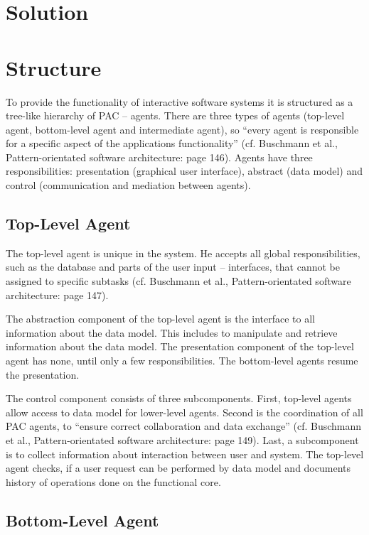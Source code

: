 \documentclass{scrbook}
\begin{document}
\section{Solution}

\section{Structure}	%

To provide the functionality of interactive software systems it is structured as a tree-like hierarchy of
PAC – agents. There are three types of agents (top-level agent, bottom-level agent and intermediate
agent), so “every agent is responsible for a specific aspect of the applications functionality” (cf.
Buschmann et al., Pattern-orientated software architecture: page 146). Agents have three
responsibilities: presentation (graphical user interface), abstract (data model) and control
(communication and mediation between agents).

\subsection{Top-Level Agent}	%

The top-level agent is unique in the system. He accepts all global responsibilities, such as the
database and parts of the user input – interfaces, that cannot be assigned to specific subtasks (cf.
Buschmann et al., Pattern-orientated software architecture: page 147).

The abstraction component of the top-level agent is the interface to all information about the data
model. This includes to manipulate and retrieve information about the data model.
The presentation component of the top-level agent has none, until only a few responsibilities. The
bottom-level agents resume the presentation.

The control component consists of three subcomponents. First, top-level agents allow access to data
model for lower-level agents. Second is the coordination of all PAC agents, to “ensure correct
collaboration and data exchange” (cf. Buschmann et al., Pattern-orientated software architecture:
page 149). Last, a subcomponent is to collect information about interaction between user and
system. The top-level agent checks, if a user request can be performed by data model and
documents history of operations done on the functional core.



\subsection{Bottom-Level Agent}
\end{document}
